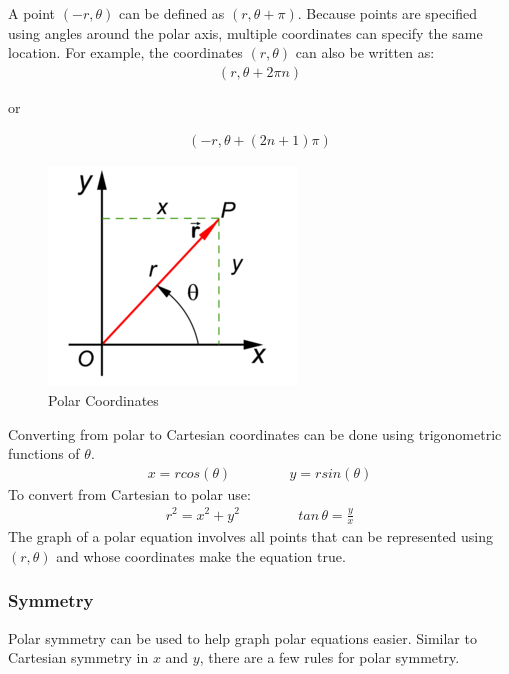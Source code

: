 \documentclass{article}
\begin{document}
A point $(-r,\theta)$ can be defined as $(r,\theta+\pi)$. Because points are specified using angles around the polar axis, multiple coordinates can specify the same location. For example, the coordinates $(r,\theta)$ can also be written as:
\begin{gather*}
(r, \theta+2\pi n)
\end{gather*}
\begin{center}
    or
\end{center}
\begin{gather*}
(-r, \theta+(2n+1)\pi)
\end{gather*}
\begin{figure}[H]
\begin{center}
\includegraphics[scale=5]{MC11-polar.png}
\caption{Polar Coordinates}
\label{polar}
\end{center}
\end{figure}
Converting from polar to Cartesian coordinates can be done using trigonometric functions of $\theta$.
\begin{gather*}
    x = r cos(\theta)\hspace{50pt} y = r sin(\theta)
\end{gather*}
To convert from Cartesian to polar use:
\begin{gather*}
    r^2 = x^2 + y^2 \hspace{50pt} tan\hspace{2pt}\theta = \frac{y}{x}
\end{gather*}
The graph of a polar equation involves all points that can be represented using $(r,\theta)$ and whose coordinates make the equation true.\\
\subsubsection{Symmetry}
Polar symmetry can be used to help graph polar equations easier. Similar to Cartesian symmetry in $x$ and $y$, there are a few rules for polar symmetry.\\
\end{document}
